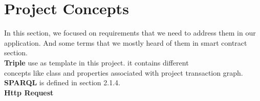      

\section{Project Concepts}

In this section, we focused on requirements that we need to address them in our application.
And some terms that we mostly heard of them in smart contract section.\\
\textbf{Triple} use as template in this project. it contains different \\ concepts like class and properties associated with project transaction graph.\\
\textbf{SPARQL} is defined in section 2.1.4.\\

\textbf{Http Request} 
